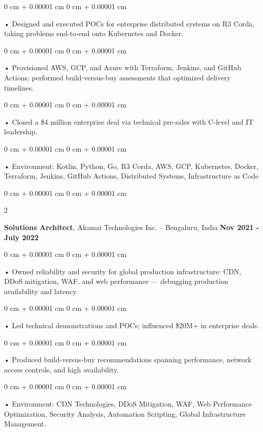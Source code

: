 \documentclass[10pt, letterpaper]{article}
\newenvironment{onecolentry}{
    \begin{adjustwidth}{
        0 cm + 0.00001 cm
    }{
        0 cm + 0.00001 cm
    }
}{
    \end{adjustwidth}
} %
\newenvironment{twocolentry}[2][]{
    \onecolentry
    \def\secondColumn{#2}
    \setcolumnwidth{\fill, 4.5 cm}
    \begin{paracol}{2}
}{
    \switchcolumn \raggedleft \secondColumn
    \end{paracol}
    \endonecolentry
} %
\begin{document}
        \begin{onecolentry}
             • Designed and executed POCs for enterprise distributed systems on R3 Corda, taking problems end-to-end onto Kubernetes and Docker.
        \end{onecolentry}
        \begin{onecolentry}
             • Provisioned AWS, GCP, and Azure with Terraform, Jenkins, and GitHub Actions; performed build-versus-buy assessments that optimized delivery timelines.
        \end{onecolentry}
        \begin{onecolentry}
             • Closed a \$4 million enterprise deal via technical pre-sales with C-level and IT leadership.
        \end{onecolentry}
        \begin{onecolentry}
             • Environment: Kotlin, Python, Go, R3 Corda, AWS, GCP, Kubernetes, Docker, Terraform, Jenkins, GitHub Actions, Distributed Systems, Infrastructure as Code
        \end{onecolentry}
        \vspace{0.1cm}

        \begin{twocolentry}{
            \textbf{Nov 2021 - July 2022}
        }
            \textbf{Solutions Architect}, Akamai Technologies Inc. -- Bengaluru, India \end{twocolentry}
        \begin{onecolentry}
            • Owned reliability and security for global production infrastructure: CDN, DDoS mitigation, WAF, and web performance --- debugging production availability and latency.
        \end{onecolentry}
        \begin{onecolentry}
            • Led technical demonstrations and POCs; influenced \$20M+ in enterprise deals.
        \end{onecolentry}
        \begin{onecolentry}
             • Produced build-versus-buy recommendations spanning performance, network access controls, and high availability.
        \end{onecolentry}
        \begin{onecolentry}
             • Environment: CDN Technologies, DDoS Mitigation, WAF, Web Performance Optimization, Security Analysis, Automation Scripting, Global Infrastructure Management.
        \end{onecolentry}
\end{document}
